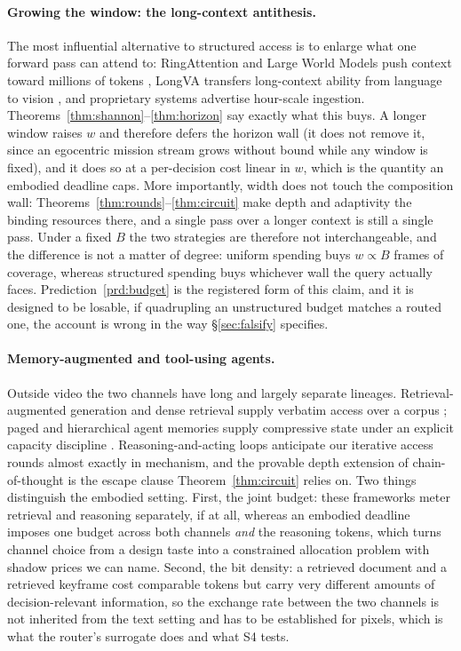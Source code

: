 \documentclass[10pt]{article}
\theoremstyle{definition}
\theoremstyle{plain}
\begin{document}
\paragraph{Growing the window: the long-context antithesis.}
The most influential alternative to structured access is to enlarge what one forward pass can attend to: RingAttention and Large World Models push context toward millions of tokens \citep{ringattention,lwm}, LongVA transfers long-context ability from language to vision \citep{longva}, and proprietary systems advertise hour-scale ingestion. Theorems~\ref{thm:shannon}--\ref{thm:horizon} say exactly what this buys. A longer window raises $w$ and therefore defers the horizon wall (it does not remove it, since an egocentric mission stream grows without bound while any window is fixed), and it does so at a per-decision cost linear in $w$, which is the quantity an embodied deadline caps. More importantly, width does not touch the composition wall: Theorems~\ref{thm:rounds}--\ref{thm:circuit} make depth and adaptivity the binding resources there, and a single pass over a longer context is still a single pass. Under a fixed $B$ the two strategies are therefore not interchangeable, and the difference is not a matter of degree: uniform spending buys $w \propto B$ frames of coverage, whereas structured spending buys whichever wall the query actually faces. Prediction~\ref{prd:budget} is the registered form of this claim, and it is designed to be losable, if quadrupling an unstructured budget matches a routed one, the account is wrong in the way \S\ref{sec:falsify} specifies.

\paragraph{Memory-augmented and tool-using agents.}
Outside video the two channels have long and largely separate lineages. Retrieval-augmented generation and dense retrieval supply verbatim access over a corpus \citep{lewis-rag,dpr}; paged and hierarchical agent memories supply compressive state under an explicit capacity discipline \citep{memgpt,hipporag}. Reasoning-and-acting loops \citep{react,reflexion,toolformer} anticipate our iterative access rounds almost exactly in mechanism, and the provable depth extension of chain-of-thought \citep{wei-cot,feng-cot,merrill-cot} is the escape clause Theorem~\ref{thm:circuit} relies on. Two things distinguish the embodied setting. First, the joint budget: these frameworks meter retrieval and reasoning separately, if at all, whereas an embodied deadline imposes one budget across both channels \emph{and} the reasoning tokens, which turns channel choice from a design taste into a constrained allocation problem with shadow prices we can name. Second, the bit density: a retrieved document and a retrieved keyframe cost comparable tokens but carry very different amounts of decision-relevant information, so the exchange rate between the two channels is not inherited from the text setting and has to be established for pixels, which is what the router's surrogate does and what S4 tests.
\end{document}
